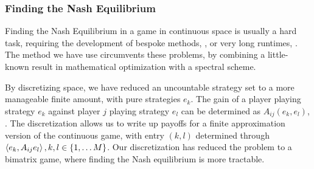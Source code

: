 \subsubsection*{Finding the Nash Equilibrium}
Finding the Nash Equilibrium in a game in continuous space is usually a hard task, requiring the development of bespoke methods, \citep{verticalmigration}, or very long runtimes, \citep{jerome}. The method we have use circumvents these problems, by combining a little-known result in mathematical optimization with a spectral scheme.

By discretizing space, we have reduced an uncountable strategy set to a more manageable finite amount, with pure strategies $e_k$. The gain of a player playing strategy $e_k$ against player $j$ playing strategy $e_l$ can be determined as $A_{ij}(e_k,e_l)$, . The discretization allows us to write up payoffs for a finite approximation version of the continuous game,  with entry $(k,l)$ determined through $\left \langle e_k,A_{ij}e_l \right \rangle, k,l \in \{1,\dots M\}$.
Our discretization has reduced the problem to a bimatrix game, where finding the Nash equilibrium is more tractable.


